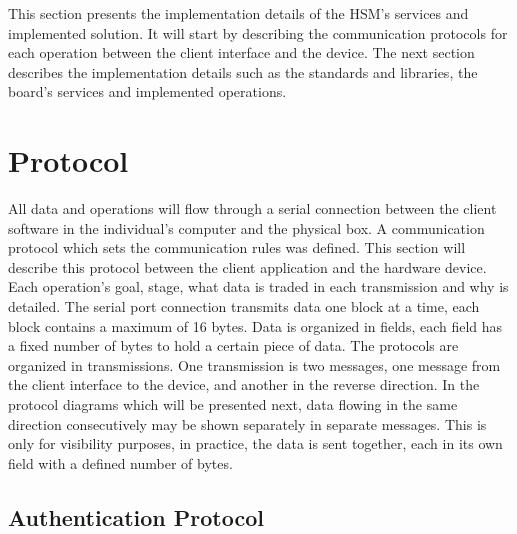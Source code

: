 \cleardoublepage
\label{chap:implementation}

This section presents the implementation details of the HSM's services and implemented solution. It will start by describing the communication protocols for each operation between the client interface and the device. The next section describes the implementation details such as the standards and libraries, the board's services and implemented operations.

\section{Protocol}\label{chap:implementation:protocol}

All data and operations will flow through a serial connection between the client software in the individual's computer and the physical box. A communication protocol which sets the communication rules was defined.
This section will describe this protocol between the client application and the hardware device. Each operation's goal, stage, what data is traded in each transmission and why is detailed.
The serial port connection transmits data one block at a time, each block contains a maximum of 16 bytes.
Data is organized in fields, each field has a fixed number of bytes to hold a certain piece of data.
The protocols are organized in transmissions. One transmission is two messages, one message from the client interface to the device, and another in the reverse direction.
In the protocol diagrams which will be presented next, data flowing in the same direction consecutively may be shown separately in separate messages. This is only for visibility purposes, in practice, the data is sent together, each in its own field with a defined number of bytes.

\subsection{Authentication Protocol}\label{chap:implementation:protocol:auth}

